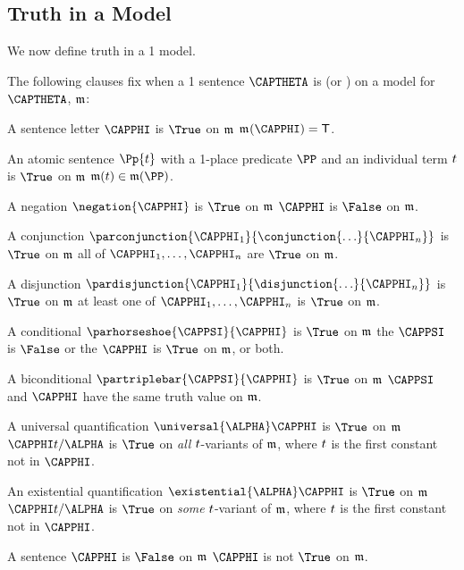 
\subsection{Truth in a Model}\label{GQL1 Truth in an Interpretation}
We now define truth in a \GQL{}1 model.

\begin{majorILnc}{}
The following clauses fix when a \GQL{}1 sentence $\CAPTHETA$ is \nidf{$\True$} (or \nidf{$\False$}) on a model for $\CAPTHETA$, $\mathfrak{m}$:
\begin{cenumerate}
\item A sentence letter $\CAPPHI$ is $\True$ on $\mathfrak{m}$ \Iff $\As{}{}(\CAPPHI)=\TrueB$.
\item An atomic sentence $\Pp{\variable{t}}$ with a 1-place predicate $\PP$ and an individual term $t$ is $\True$ on $\mathfrak{m}$ \Iff $\IntA(\variable{t})\in\IntA(\PP)$.
\item A negation $\negation{\CAPPHI}$ is $\True$ on $\mathfrak{m}$ \Iff $\CAPPHI$ is $\False$ on $\mathfrak{m}$.
\item A conjunction $\parconjunction{\CAPPHI_1}{\conjunction{\ldots}{\CAPPHI_{\integer{n}}}}$ is $\True$ on $\mathfrak{m}$ \Iff all of $\CAPPHI_1,\ldots,\CAPPHI_{\integer{n}}$ are $\True$ on $\mathfrak{m}$.
\item A disjunction $\pardisjunction{\CAPPHI_1}{\disjunction{\ldots}{\CAPPHI_{\integer{n}}}}$ is $\True$ on $\mathfrak{m}$ \Iff at least one of $\CAPPHI_1,\ldots,\CAPPHI_{\integer{n}}$ is $\True$ on $\mathfrak{m}$.
\item A conditional $\parhorseshoe{\CAPPSI}{\CAPPHI}$ is $\True$ on $\mathfrak{m}$ \Iff the  $\CAPPSI$ is $\False$ or the  $\CAPPHI$ is $\True$ on $\mathfrak{m}$, or both.
\item A biconditional $\partriplebar{\CAPPSI}{\CAPPHI}$ is $\True$ on $\mathfrak{m}$ \Iff $\CAPPSI$ and $\CAPPHI$ have the same truth value on $\mathfrak{m}$.
\item\label{GQL1TruthUnvQuant} A universal quantification $\universal{\ALPHA}\CAPPHI$ is $\True$ on $\mathfrak{m}$ \Iff $\CAPPHI\variable{t}/\ALPHA$ is $\True$ on \emph{all} $t$-variants of $\mathfrak{m}$, where $t$ is the first constant not in $\CAPPHI$.
\item An existential quantification $\existential{\ALPHA}\CAPPHI$ is $\True$ on $\mathfrak{m}$ \Iff $\CAPPHI\variable{t}/\ALPHA$ is $\True$ on \emph{some} $t$-variant of $\mathfrak{m}$, where $t$ is the first constant not in $\CAPPHI$.
\item A sentence $\CAPPHI$ is $\False$ on $\mathfrak{m}$ \Iff $\CAPPHI$ is not $\True$ on $\mathfrak{m}$.
\end{cenumerate}
\end{majorILnc}

